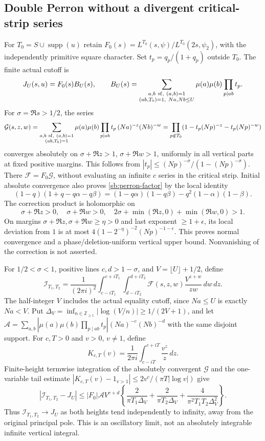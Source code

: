 \documentclass[11pt]{article}
\theoremstyle{definition}\newtheorem{definition}[theorem]{Definition}
\theoremstyle{remark}\newtheorem{remark}[theorem]{Remark}
\begin{document}
\subsection{Double Perron without a divergent critical-strip series}
For $T_0=S\cup\operatorname{supp}(u)$ retain
$F_0(s)=L^{T_0}(s,\psi)/L^{T_0}(2s,\psi_2)$, with the independently
primitive square character. Set $t_p=q_p/(1+q_p)$ outside $T_0$.
The finite actual cutoff is
\[
 J_U(s,u)=F_0(s)B_U(s),\qquad
 B_U(s)=\sum_{\substack{a,b\ {\rm sf},\ (a,b)=1\\
                  (ab,T_0)=1,\ Na,Nb\le U}}
 \mu(a)\mu(b)\prod_{p\mid ab}t_p.
\]
For $\sigma=\Re s>1/2$, the series
\[
 \mathcal G(s,z,w)=\sum_{\substack{a,b\ {\rm sf},\ (a,b)=1\\(ab,T_0)=1}}
 \mu(a)\mu(b)\prod_{p\mid ab}t_p\,(Na)^{-z}(Nb)^{-w}
 =\prod_{p\notin T_0}(1-t_p(Np)^{-z}-t_p(Np)^{-w})
\]
converges absolutely on $\sigma+\Re z>1$, $\sigma+\Re w>1$, uniformly
in all vertical parts at fixed positive margins. This follows from
$|t_p|\le(Np)^{-\sigma}/(1-(Np)^{-\sigma})$. There
$\mathcal F=F_0\mathcal G$, without evaluating an infinite $c$ series
in the critical strip. Initial absolute convergence also proves
\eqref{sb:perron-factor} by the local identity
\[
 (1-q)(1+q-q\alpha-q\beta)
 =(1-q\alpha)(1-q\beta)-q^2(1-\alpha)(1-\beta).
\]
The correction product is holomorphic on
\[
 \sigma+\Re z>0,\quad\sigma+\Re w>0,\quad
 2\sigma+\min(\Re z,0)+\min(\Re w,0)>1.
\]
On margins $\sigma+\Re z,\sigma+\Re w\ge\eta>0$ and last exponent
$\ge1+\epsilon$, its local deviation from $1$ is at most
$4(1-2^{-\eta})^{-2}(Np)^{-1-\epsilon}$. This proves normal convergence
and a phase/deletion-uniform vertical upper bound. Nonvanishing of the
correction is not asserted.

For $1/2<\sigma<1$, positive lines $c,d>1-\sigma$, and
$V=\lfloor U\rfloor+1/2$, define
\[
 \mathcal I_{T_1,T_2}=\frac1{(2\pi i)^2}
 \int_{c-iT_1}^{c+iT_1}\int_{d-iT_2}^{d+iT_2}
 \mathcal F(s,z,w)\frac{V^{z+w}}{zw}\,dw\,dz.
\]
The half-integer $V$ includes the actual equality cutoff, since
$Na\le U$ is exactly $Na<V$. Put
$\Delta_V=\inf_{n\in\mathbb Z_{\ge1}}|\log(V/n)|\ge1/(2V+1)$, and let
$\mathcal A=\sum_{a,b}|\mu(a)\mu(b)\prod_{p\mid ab}t_p|
(Na)^{-c}(Nb)^{-d}$ with the same disjoint support.
For $c,T>0$ and $v>0$, $v\ne1$, define
\[
 K_{c,T}(v)=\frac1{2\pi i}\int_{c-iT}^{c+iT}\frac{v^z}{z}\,dz.
\]
Finite-height termwise integration of the absolutely convergent
$\mathcal G$ and the one-variable tail estimate
$|K_{c,T}(v)-1_{v>1}|\le2v^c/(\pi T|\log v|)$ give
\begin{equation}
 |\mathcal I_{T_1,T_2}-J_U|
 \le |F_0|\mathcal A V^{c+d}
 \left\{\frac2{\pi T_1\Delta_V}+\frac2{\pi T_2\Delta_V}
       +\frac4{\pi^2T_1T_2\Delta_V^2}\right\}.      \label{sb:perron-error}
\end{equation}
Thus $\mathcal I_{T_1,T_2}\to J_U$ as both heights tend independently to
infinity, away from the original principal pole. This is an oscillatory
limit, not an absolutely integrable infinite vertical integral.
\end{document}
